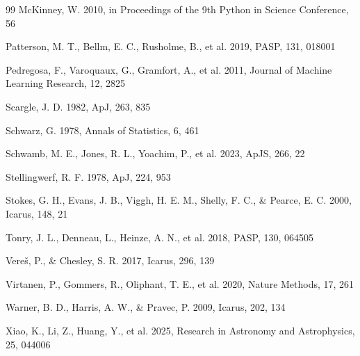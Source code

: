 \documentclass[referee]{raa}
\begin{document}
\begin{thebibliography}{99}
McKinney, W. 2010, in Proceedings of the 9th Python in Science Conference, 56

Patterson, M. T., Bellm, E. C., Rusholme, B., et al. 2019, PASP, 131, 018001

Pedregosa, F., Varoquaux, G., Gramfort, A., et al. 2011, Journal of Machine Learning Research, 12, 2825

Scargle, J. D. 1982, ApJ, 263, 835

Schwarz, G. 1978, Annals of Statistics, 6, 461

Schwamb, M. E., Jones, R. L., Yoachim, P., et al. 2023, ApJS, 266, 22

Stellingwerf, R. F. 1978, ApJ, 224, 953

Stokes, G. H., Evans, J. B., Viggh, H. E. M., Shelly, F. C., \& Pearce, E. C. 2000, Icarus, 148, 21

Tonry, J. L., Denneau, L., Heinze, A. N., et al. 2018, PASP, 130, 064505

Vere\v{s}, P., \& Chesley, S. R. 2017, Icarus, 296, 139

Virtanen, P., Gommers, R., Oliphant, T. E., et al. 2020, Nature Methods, 17, 261

Warner, B. D., Harris, A. W., \& Pravec, P. 2009, Icarus, 202, 134

Xiao, K., Li, Z., Huang, Y., et al. 2025, Research in Astronomy and Astrophysics, 25, 044006

\end{thebibliography}
\end{document}

